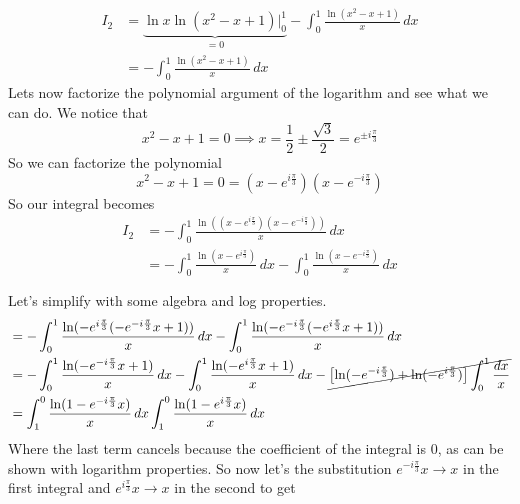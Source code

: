 \documentclass{article}
\begin{document}
%
\begin{equation*}
    \begin{split}
        I_2&=\underbrace{\ln{x}\ln(x^2-x+1)\Big|_{0}^{1}}_{=0}-\int_{0}^{1} \frac{\ln(x^2-x+1)}{x}\,dx \\
        &=-\int_{0}^{1} \frac{\ln(x^2-x+1)}{x}\,dx 
    \end{split}
\end{equation*}
Lets now factorize the polynomial argument of the logarithm and see what we can do. We notice that
\begin{equation*}
    x^2-x+1=0 \implies x=\frac{1}{2}\pm\frac{\sqrt{3}}{2}=e^{\pm i \frac{\pi}{3}}
\end{equation*}
So we can factorize the polynomial
\begin{equation*}
     x^2-x+1=0=(x-e^{i\frac{\pi}{3}})(x-e^{-i\frac{\pi}{3}})
\end{equation*} \newpage
So our integral becomes
\begin{equation*}
    \begin{split}
        I_2&=-\int_{0}^{1} \frac{\ln((x-e^{i\frac{\pi}{3}})(x-e^{-i\frac{\pi}{3}}))}{x}\,dx \\
        &=-\int_{0}^{1} \frac{\ln(x-e^{i\frac{\pi}{3}})}{x}\,dx-\int_{0}^{1} \frac{\ln(x-e^{-i\frac{\pi}{3}})}{x}\,dx \\ \\
    \end{split}
\end{equation*}
 Let's simplify with some algebra and log properties.
    \begin{equation*}
        \begin{split}
        &=-\int_{0}^{1} \frac{\ln(-e^{i\frac{\pi}{3}}(-e^{-i\frac{\pi}{3}}x+1))}{x}\,dx-\int_{0}^{1} \frac{\ln(-e^{-i\frac{\pi}{3}}(-e^{i\frac{\pi}{3}}x+1))}{x}\,dx\\
        &=-\int_{0}^{1} \frac{\ln(-e^{-i\frac{\pi}{3}}x+1)}{x}\,dx  -\int_{0}^{1} \frac{\ln(-e^{i\frac{\pi}{3}}x+1)}{x}\,dx-\cancel{{\left[\ln(-e^{-i\frac{\pi}{3}})+\ln(-e^{i\frac{\pi}{3}})\right]\int_{0}^{1}\frac{dx}{x}}} \\
        &=\int_{1}^{0} \frac{\ln(1-e^{-i\frac{\pi}{3}}x)}{x}\,dx  \int_{1}^{0} \frac{\ln(1-e^{i\frac{\pi}{3}}x)}{x}\,dx
        \end{split}
    \end{equation*}
Where the last term cancels because the coefficient of the integral is 0, as can be shown with logarithm properties. So now let's the substitution $e^{-i\frac{\pi}{3}}x\rightarrow x$ in the first integral and $e^{i\frac{\pi}{3}}x\rightarrow x$ in the second to get
\end{document}
